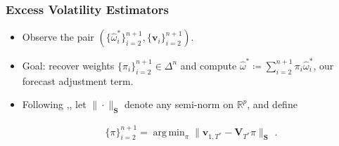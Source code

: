 \documentclass[9pt]{beamer}
\newcommand{\weight}{\pi}
\newcommand{\V}{\textbf{V}}
\DeclareMathOperator*{\argmin}{arg\,min} %
\theoremstyle{definition}
\begin{document}
\begin{frame}
\frametitle{Excess Volatility Estimators}

\begin{itemize}

\item <1->  Observe the pair $(\{\hat\omega^{*}_{i}\}^{n+1}_{i=2},\{\textbf{v}_{i}\}^{n+1}_{i=2})$.  \\

\item <2-> Goal: recover weights $\{\weight_{i}\}^{n+1}_{i=2} \in \Delta^{n}$ and compute $\hat\omega^{*} \coloneq \sum^{n+1}_{i=2}\weight_{i}\hat\omega^{*}_{i}$, our forecast adjustment term.

\item <3-> Following \cite[][]{abadie2003economic},\cite[][]{abadie2010synthetic}, let $\|\cdot\|_{\textbf{S}}$ denote any semi-norm on $\mathbb{R}^{p}$, and define


\begin{align*}
\{\pi\}_{i=2}^{n+1} = \argmin_{\pi}\|\textbf{v}_{1,T^{*}} - \V_{T^{*}}\pi \|_{\textbf{S}} \text{ .}
\end{align*}


\end{itemize}
\end{frame}
\end{document}
